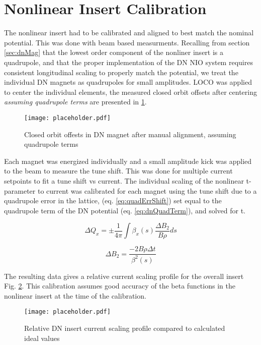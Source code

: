 \section{Nonlinear Insert Calibration} \label{sec:nioCal}
The nonlinear insert had to be calibrated and aligned to best match the nominal potential. This was done with beam based measurments. Recalling from section \ref{sec:dnMag} that the lowest order component of the nonliner insert is a quadrupole, and that the proper implementation of the DN NIO system requires consistent longitudinal scaling to properly match the potential, we treat the individual DN magnets as quadrupoles for small amplitudes. LOCO was applied to center the individual elements, the measured closed orbit offsets after centering \textit{assuming quadrupole terms} are presented in \ref{fig:dnOffset}. 

\begin{figure}
	\centering
	\texttt{[image: placeholder.pdf]}
	\caption{Closed orbit offests in DN magnet after manual alignment, assuming quadrupole terms}
	\label{fig:dnOffset}
\end{figure}


Each magnet was energized individually and a small amplitude kick was applied to the beam to measure the tune shift. This was done for multiple current setpoints to fit a tune shift vs current.
The individual scaling of the nonlinear t-parameter to current was calibrated for each magnet using the tune shift due to a quadrupole error in the lattice, (eq. \ref{eq:quadErrShift}) set equal to the quadrupole term of the DN potential (eq. \ref{eq:dnQuadTerm}), and solved for t.

\begin{equation}
    	\Delta Q_{x} = \pm \frac{1}{4\pi}\int{\beta_x(s) \frac{\Delta B_2}{B\rho} ds}
    	\label{eq:quadErrShift}
\end{equation}

\begin{equation}
	\Delta B_2 = \frac{-2B\rho \Delta t}{\beta^2(s)}
	\label{eq:dnQuadTerm}
\end{equation}

The resulting data gives a relative current scaling profile for the overall insert Fig. \ref{fig:dnIscaling}. This calibration assumes good accuracy of the beta functions in the nonlinear insert at the time of the calibration.

\begin{figure}
    \centering
    \texttt{[image: placeholder.pdf]}
    \caption{Relative DN insert current scaling profile compared to calculated ideal values}
    \label{fig:dnIscaling}
\end{figure}

